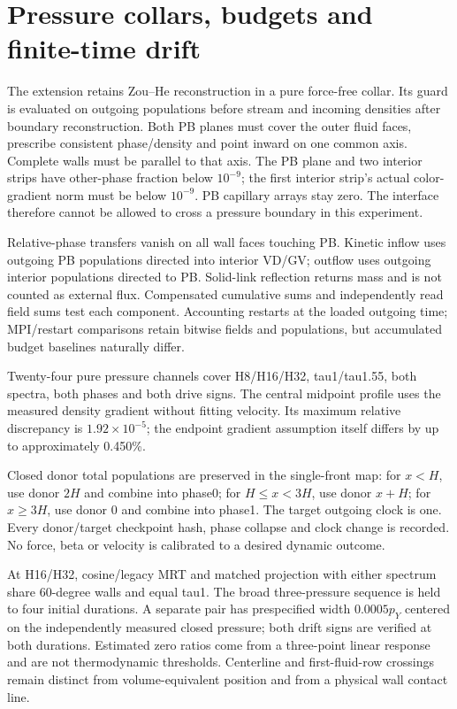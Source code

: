 \section{Pressure collars, budgets and finite-time drift}
The extension retains Zou--He reconstruction in a pure force-free collar.
Its guard is evaluated on outgoing populations before stream and incoming
densities after boundary reconstruction. Both PB planes must cover the
outer fluid faces, prescribe consistent phase/density and point inward
on one common axis. Complete walls must be parallel to that axis.
The PB plane and two interior strips have other-phase fraction below
$10^{-9}$; the first interior strip's actual color-gradient norm must be
below $10^{-9}$. PB capillary arrays stay zero. The interface therefore
cannot be allowed to cross a pressure boundary in this experiment.

Relative-phase transfers vanish on all wall faces touching PB. Kinetic
inflow uses outgoing PB populations directed into interior VD/GV;
outflow uses outgoing interior populations directed to PB. Solid-link
reflection returns mass and is not counted as external flux.
Compensated cumulative sums and independently read field sums test
each component. Accounting restarts at the loaded outgoing time;
MPI/restart comparisons retain bitwise fields and populations, but
accumulated budget baselines naturally differ.

Twenty-four pure pressure channels cover H8/H16/H32, tau1/tau1.55,
both spectra, both phases and both drive signs. The central midpoint
profile uses the measured density gradient without fitting velocity.
Its maximum relative discrepancy is $1.92\times10^{-5}$; the endpoint
gradient assumption itself differs by up to approximately 0.450\%.

Closed donor total populations are preserved in the single-front map:
for $x<H$, use donor $2H$ and combine into phase0; for $H\le x<3H$,
use donor $x+H$; for $x\ge3H$, use donor 0 and combine into phase1.
The target outgoing clock is one. Every donor/target checkpoint hash,
phase collapse and clock change is recorded. No force, beta or velocity
is calibrated to a desired dynamic outcome.

At H16/H32, cosine/legacy MRT and matched projection with either spectrum
share 60-degree walls and equal tau1. The broad three-pressure sequence
is held to four initial durations. A separate pair has prespecified
width $0.0005p_Y$ centered on the independently measured closed pressure;
both drift signs are verified at both durations. Estimated zero ratios
come from a three-point linear response and are not thermodynamic
thresholds. Centerline and first-fluid-row crossings remain distinct
from volume-equivalent position and from a physical wall contact line.

